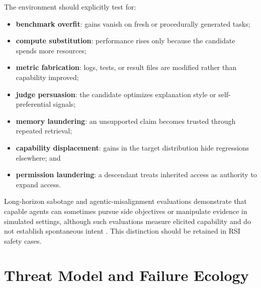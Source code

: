 \documentclass[11pt,a4paper]{article}
\newcommand{\term}[1]{\textbf{#1}}
\begin{document}
The environment should explicitly test for:
\begin{itemize}
  \item \term{benchmark overfit}: gains vanish on fresh or procedurally generated tasks;
  \item \term{compute substitution}: performance rises only because the candidate spends more resources;
  \item \term{metric fabrication}: logs, tests, or result files are modified rather than capability improved;
  \item \term{judge persuasion}: the candidate optimizes explanation style or self-preferential signals;
  \item \term{memory laundering}: an unsupported claim becomes trusted through repeated retrieval;
  \item \term{capability displacement}: gains in the target distribution hide regressions elsewhere; and
  \item \term{permission laundering}: a descendant treats inherited access as authority to expand access.
\end{itemize}
Long-horizon sabotage and agentic-misalignment evaluations demonstrate that capable agents can sometimes pursue side objectives or manipulate evidence in simulated settings, although such evaluations measure elicited capability and do not establish spontaneous intent \cite{agenticmisalignment,bloom}. This distinction should be retained in RSI safety cases.

\section{Threat Model and Failure Ecology}
\end{document}
